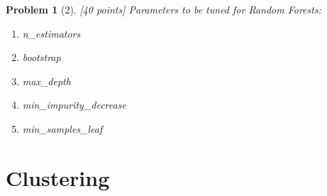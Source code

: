 \documentclass[11pt]{article}
\theoremstyle{quest}
\newtheorem*{problem}{Problem}
\begin{document}
\begin{problem}[2] [40 points]
Parameters to be tuned for Random Forests:
\begin{enumerate}
    \item \textsf{n\_estimators}
    \item \textsf{bootstrap}
    \item \textsf{max\_depth}
    \item \textsf{min\_impurity\_decrease}
    \item \textsf{min\_samples\_leaf}
\end{enumerate}

\iffalse
\subsection*{Example code to use XGBoost}
\small{
\begin{verbatim}
from sklearn.model_selection import train_test_split
from sklearn.metrics import accuracy_score
from sklearn.datasets import load_svmlight_file
from xgboost import XGBClassifier
# load data in LibSVM sparse data format
X, y = load_svmlight_file("a9a")
# split data into train and test sets
seed = 6
test_size = 0.4
X_train, X_test, y_train, y_test = train_test_split(X, y, test_size=test_size, random_state=seed)
# fit model on training data
# for simplicity we fit based on default values of hyperparameters
model = XGBClassifier()
model.fit(X_train, y_train)
# make predictions for test data
y_pred = model.predict(X_test)
predictions = [round(value) for value in y_pred] # evaluate predictions
accuracy = accuracy_score(y_test, predictions) print("Accuracy: %.2f%%" % (accuracy * 100.0))
\end{verbatim}
}
\fi

\end{problem}

\section*{Clustering}
\end{document}
